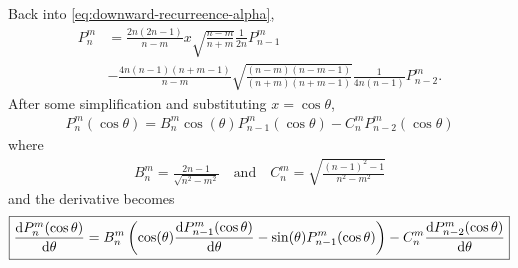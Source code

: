 \documentclass[12pt]{article}
\begin{document}
Back into \eqref{eq:downward-recurreence-alpha}, 
\begin{align}
  P_n^m &= \frac{2n(2n-1)}{n-m}x\sqrt{\frac{n-m}{n+m}}\frac{1}{2n}P_{n-1}^m\\ 
        &- \frac{4n(n-1)(n+m-1)}{n-m}\sqrt{\frac{(n-m)(n-m-1)}{(n+m)(n+m-1)}}\frac{1}{4n(n-1)}P_{n-2}^m. 
\end{align}
After some simplification and substituting $x = \cos\theta$,
\begin{align}
  \boxed{P_n^m(\cos\theta) = B_n^m\cos(\theta)P_{n-1}^m(\cos\theta) - C_n^mP_{n-2}^m(\cos\theta)}
\end{align}
where 
\begin{align}
  \boxed{B_n^m = \frac{2n-1}{\sqrt{n^2-m^2}}\quad\text{and}\quad C_n^m = \sqrt{\frac{(n-1)^2 - 1}{n^2-m^2}}}
\end{align}
and the derivative becomes 
\begin{align}
  \boxed{\derivative{P_n^m(\cos\theta)}{\theta} = B_n^m\left(\cos(\theta)\derivative{P_{n-1}^m(\cos\theta)}{\theta} - \sin(\theta)P_{n-1}^m(\cos\theta)\right) - C_n^m\derivative{P_{n-2}^m(\cos\theta)}{\theta}}
\end{align}

%


\printbibliography
\end{document}

